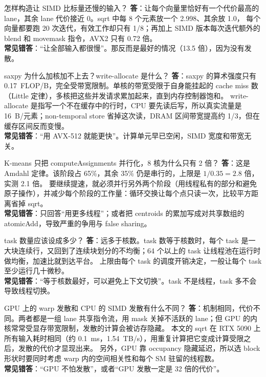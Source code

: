 \documentclass[11pt,a4paper]{ctexart}
\begin{document}
\begin{iqbox}{怎样构造让 SIMD 比标量还慢的输入？}
\textbf{答}：让每个向量里恰好有一个代价最高的 lane，其余 lane 代价接近 0。sqrt 中每 8 个元素放一个 2.998、其余放 1.0，
每个向量都要跑 20 次迭代，有效工作却只有 1/8；再加上 SIMD 版本每次迭代额外的 blend 和 movemask 指令，AVX2 只有 0.72 倍。\\
\textbf{常见错答}：``让全部输入都很慢''。那反而是最好的情况（13.5 倍），因为没有发散。
\end{iqbox}

\begin{iqbox}{saxpy 为什么加核加不上去？write-allocate 是什么？}
\textbf{答}：saxpy 的算术强度只有 0.17~FLOP/B，完全受带宽限制。单核的带宽受限于自身能挂起的 cache miss 数（Little 定律），多核把这些并发请求累加起来，直到内存控制器饱和。
write-allocate 是指写一个不在缓存中的行时，CPU 要先读后写，所以真实流量是 16~B/元素；non-temporal store 省掉这次读，DRAM 区间带宽提高约 1/3，但在缓存区间反而变慢。\\
\textbf{常见错答}：``用 AVX-512 就能更快''。计算单元早已空闲，SIMD 宽度和带宽无关。
\end{iqbox}

\begin{iqbox}{K-means 只把 computeAssignments 并行化，8 核为什么只有 2 倍？}
\textbf{答}：这是 Amdahl 定律。该阶段占 65\%，其余 35\% 仍是串行的，上限是 $1/0.35=2.8$ 倍，实测 2.1 倍。
要继续提速，就必须并行另外两个阶段（用线程私有的部分和避免原子操作），并减少每个阶段的工作量：循环交换让每个点只读一次，比较平方距离省掉 sqrt。\\
\textbf{常见错答}：只回答``用更多线程''；或者把 centroids 的累加写成对共享数组的 atomicAdd，导致严重的争用与 false sharing。
\end{iqbox}

\begin{iqbox}{task 数量应该设成多少？}
\textbf{答}：远多于核数。task 数等于核数时，每个 task 是一大块连续行，又回到了连续块划分的不均衡；64 个以上的 task 让线程池在运行时做均衡，加速比就到达平台。
上限由每个 task 的调度开销决定，一般让每个 task 至少运行几十微秒。\\
\textbf{常见错答}：``等于核数最好，可以避免上下文切换''。task 不是线程，task 多不会导致线程切换。
\end{iqbox}

\begin{iqbox}{GPU 上的 warp 发散和 CPU 的 SIMD 发散有什么不同？}
\textbf{答}：机制相同，代价不同。两者都是一组 lane 共享指令流，用 mask 关掉不活跃的 lane；但 GPU 的内核常常受显存带宽限制，发散的计算会被访存隐藏。
本文的 sqrt 在 RTX 5090 上所有输入耗时相同（约 0.1~ms，1.54~TB/s），用重复计算把它变成计算受限之后，发散的代价才显现出来。
另外，GPU 靠 occupancy 隐藏延迟，所以选 block 形状时要同时考虑 warp 内的空间相关性和每个 SM 驻留的线程数。\\
\textbf{常见错答}：``GPU 不怕发散''，或者``GPU 发散一定是 32 倍的代价''。
\end{iqbox}
\end{document}

